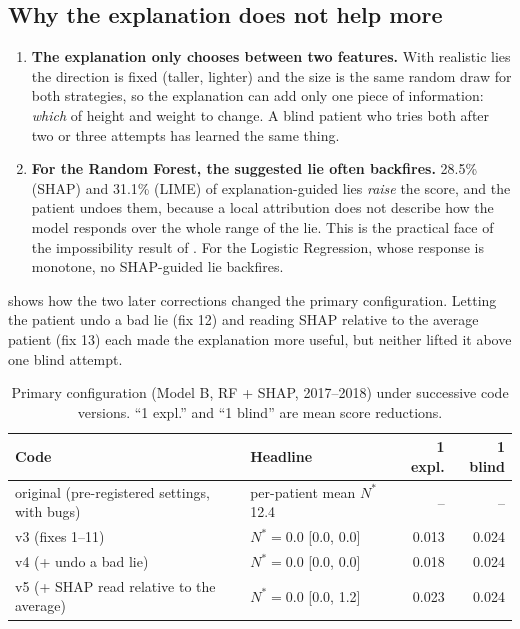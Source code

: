 \documentclass[12pt, a4paper, oneside]{report}
\theoremstyle{definition}
\begin{document}
\subsection*{Why the explanation does not help more}

\begin{enumerate}
  \item \textbf{The explanation only chooses between two features.} With
        realistic lies the direction is fixed (taller, lighter) and the
        size is the same random draw for both strategies, so the
        explanation can add only one piece of information: \emph{which}
        of height and weight to change. A blind patient who tries both
        after two or three attempts has learned the same thing.
  \item \textbf{For the Random Forest, the suggested lie often
        backfires.} 28.5\% (SHAP) and 31.1\% (LIME) of explanation-guided
        lies \emph{raise} the score, and the patient undoes them,
        because a local attribution does not describe how the model
        responds over the whole range of the lie. This is the practical
        face of the impossibility result of
        \citet{bilodeau2024impossibility}. For the Logistic Regression,
        whose response is monotone, no SHAP-guided lie backfires.
\end{enumerate}

 shows how the two later corrections changed the
primary configuration. Letting the patient undo a bad lie (fix 12) and
reading SHAP relative to the average patient (fix 13) each made the
explanation more useful, but neither lifted it above one blind attempt.

\begin{table}[htbp]
  \centering
  \caption{Primary configuration (Model B, RF + SHAP, 2017--2018) under
           successive code versions. ``1 expl.'' and ``1 blind'' are mean
           score reductions.}
  \label{tab:sensitivity}
  \small
  \begin{tabular}{llrr}
    \toprule
    Code & Headline & 1 expl. & 1 blind \\
    \midrule
    original (pre-registered settings, with bugs) & per-patient mean $N^*$ 12.4 & -- & -- \\
    v3 (fixes 1--11) & $N^* = 0.0$ [0.0, 0.0] & 0.013 & 0.024 \\
    v4 (+ undo a bad lie) & $N^* = 0.0$ [0.0, 0.0] & 0.018 & 0.024 \\
    v5 (+ SHAP read relative to the average) & $N^* = 0.0$ [0.0, 1.2] & 0.023 & 0.024 \\
    \bottomrule
  \end{tabular}
\end{table}
\end{document}
